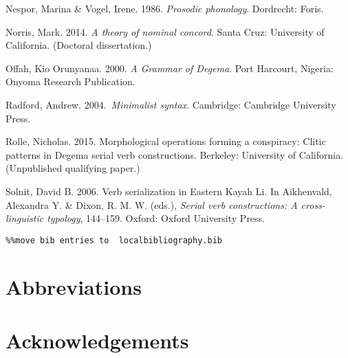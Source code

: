 \documentclass[output=paper]{langsci/langscibook}
\begin{document}
\begin{styleNoSpacing}
Nespor, Marina \& Vogel, Irene. 1986. \textit{Prosodic phonology}. Dordrecht: Foris.
\end{styleNoSpacing}

\begin{styleNoSpacing}
Norris, Mark. 2014. \textit{A theory of nominal concord}. Santa Cruz: University of California. (Doctoral dissertation.)
\end{styleNoSpacing}

\begin{styleNoSpacing}
Offah, Kio Orunyanaa. 2000. \textit{A Grammar of Degema}. Port Harcourt, Nigeria: Onyoma Research Publication.
\end{styleNoSpacing}

\begin{styleNoSpacing}
Radford, Andrew. 2004.{~}\textit{Minimalist syntax}. Cambridge: Cambridge University Press.
\end{styleNoSpacing}

\begin{styleNoSpacing}
Rolle, Nicholas. 2015. Morphological operations forming a conspiracy: Clitic patterns in Degema serial verb constructions. Berkeley: University of California. (Unpublished qualifying paper.)
\end{styleNoSpacing}

\begin{styleNoSpacing}
Solnit, David B. 2006. Verb serialization in Eastern Kayah Li. In Aikhenvald, Alexandra Y. \& Dixon, R. M. W. (eds.), \textit{Serial verb constructions: A cross-linguistic typology}, 144–159. Oxford: Oxford University Press.
\end{styleNoSpacing}


\begin{verbatim}%%move bib entries to  localbibliography.bib
\end{verbatim}

\section*{Abbreviations}
\section*{Acknowledgements}

\printbibliography[heading=subbibliography,notkeyword=this]
\end{document}
